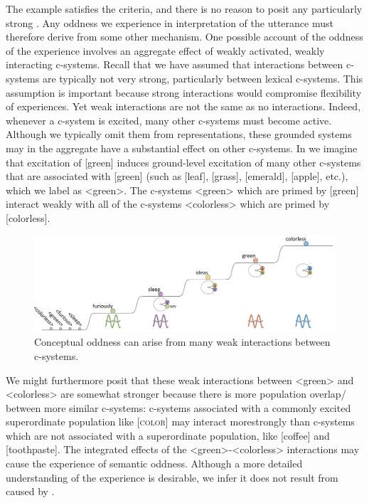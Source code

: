   The example satisfies the  criteria, and there is no reason to posit any particularly strong . Any oddness we experience in interpretation of the utterance must therefore derive from some other mechanism. One possible account of the oddness of the experience involves an aggregate effect of weakly activated, weakly interacting c-sys\-tems. Recall that we have assumed that interactions between c-sys\-tems are typically not very strong, particularly between lexical c-sys\-tems. This assumption is important because strong interactions would compromise flexibility of  experiences. Yet weak interactions are not the same as no interactions. Indeed, whenever a c-sys\-tem is excited, many other c-sys\-tems must become active. Although we typically omit them from representations, these grounded systems may in the aggregate have a substantial effect on other c-sys\-tems. In {} we imagine that excitation of [green] induces ground-level excitation of many other c-sys\-tems that are associated with [green] (such as [leaf], [grass], [emerald], [apple], etc.), which we label as <green>. The c-sys\-tems <green> which are primed by [green] interact weakly with all of the c-sys\-tems <colorless> which are primed by [colorless]. 

  
\begin{figure}
\includegraphics[width=\textwidth]{figures/Tilsen-img134.png}
\caption{Conceptual oddness can arise from many weak interactions between c-sys\-tems.}
\label{fig:6:15}
\end{figure}
 

  We might furthermore posit that these weak interactions between <green> and <colorless> are somewhat stronger because there is more population overlap/ between more similar c-sys\-tems: c-sys\-tems associated with a commonly excited superordinate population like [\textsc{color}] may interact more\linebreak strongly than c-sys\-tems which are not associated with a superordinate population, like [coffee] and [toothpaste]. The integrated effects of the <green>-<color\-less> interactions may cause the experience of semantic oddness. Although a more detailed understanding of the experience is desirable, we infer it does not result from  caused by .

